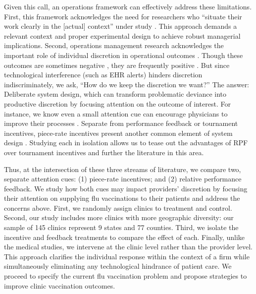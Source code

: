  Given this call, an operations framework can effectively address these limitations. First, this framework acknowledges the need for researchers who “situate their work clearly in the [actual] context” under study \citep[p.121]{Ibanez2019a}. This approach demands a relevant context and proper experimental design to achieve robust managerial implications. Second, operations management research acknowledges the important role of individual discretion in operational outcomes \citep[e.g.,][]{VanDonselaar2010,Campbell2011,Kim2015,Phillips2015}. Though these outcomes are sometimes negative \citep{Ibanez2017,Ibanez2019}, they are frequently positive \citep{Freeman2017,Song2018a}. But since technological interference (such as EHR alerts) hinders discretion indiscriminately, we ask, “How do we keep the discretion we want?” The answer: Deliberate system design, which can transform problematic deviance into productive discretion by focusing attention on the outcome of interest. For instance, we know even a small attention cue can encourage physicians to improve their processes \citep{Song2018a,Kim2020}. Separate from performance feedback or tournament incentives, piece-rate incentives present another common element of system design \citep{Prendergast1999,Lazear2018}. Studying each in isolation allows us to tease out the advantages of RPF over tournament incentives and further the literature in this area. 
 
 Thus, at the intersection of these three streams of literature, we compare two, separate attention cues: (1) piece-rate incentives; and (2) relative performance feedback. We study how both cues may impact providers’ discretion by focusing their attention on supplying flu vaccinations to their patients and address the concerns above. First, we randomly assign clinics to treatment and control. Second, our study includes more clinics with more geographic diversity: our sample of 145 clinics represent 9 states and 77 counties. Third, we isolate the incentive and feedback treatments to compare the effect of each. Finally, unlike the medical studies, we intervene at the clinic level rather than the provider level. This approach clarifies the individual response within the context of a firm while simultaneously eliminating any technological hindrance of patient care. We proceed to specify the current flu vaccination problem and propose strategies to improve clinic vaccination outcomes.  

